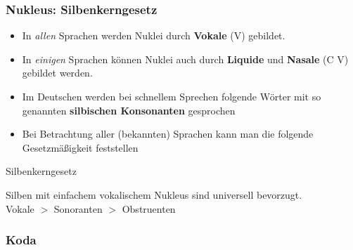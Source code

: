 \begin{frame}
\frametitle{Nukleus: Silbenkerngesetz}

\begin{itemize}

	\item In \emph{allen} Sprachen werden Nuklei durch \textbf{Vokale} (V) gebildet.
	
	\item In \emph{einigen} Sprachen können Nuklei auch durch \textbf{Liquide} und \textbf{Nasale} (C \vs V) gebildet werden.

	\item Im Deutschen werden bei schnellem Sprechen folgende Wörter mit so genannten \textbf{silbischen Konsonanten} gesprochen
	
	\begin{multicols}{2}
          \ea
          \z
          
          \ea
           
          \z
	\end{multicols}

\pause 

	\item Bei Betrachtung aller (bekannten) Sprachen kann man die folgende Gesetzmäßigkeit feststellen \citep[cf.][217f.]{Hall00a}

\end{itemize}
	
	\begin{block}{Silbenkerngesetz}
	
	Silben mit einfachem vokalischem Nukleus sind universell bevorzugt.\\
	Vokale $>$ Sonoranten $>$ Obstruenten 
	\end{block}
	
\end{frame}



\subsubsection{Koda}

